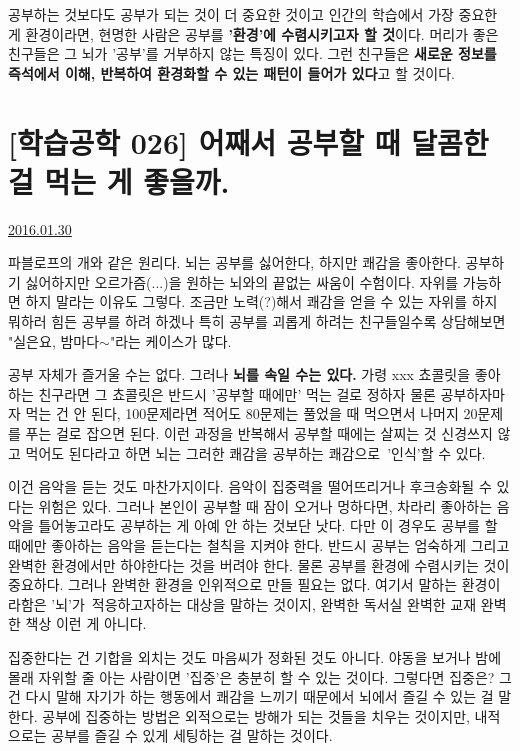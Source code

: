 공부하는 것보다도 공부가 되는 것이 더 중요한 것이고
인간의 학습에서 가장 중요한 게 환경이라면, 현명한 사람은 공부를 \textbf{'환경'에 수렴시키고자 할 것}이다.
머리가 좋은 친구들은 그 뇌가 '공부'를 거부하지 않는 특징이 있다.
그런 친구들은 \textbf{새로운 정보를 즉석에서 이해, 반복하여 환경화할 수 있는 패턴이 들어가 있다}고 할 것이다.
\vspace{5mm}






\section{[학습공학 026] 어째서 공부할 때 달콤한 걸 먹는 게 좋을까.}
\href{https://www.kockoc.com/Apoc/616850}{2016.01.30}

\vspace{5mm}

파블로프의 개와 같은 원리다.
뇌는 공부를 싫어한다, 하지만 쾌감을 좋아한다.
공부하기 싫어하지만 오르가즘(...)을 원하는 뇌와의 끝없는 싸움이 수험이다.
자위를 가능하면 하지 말라는 이유도 그렇다.
조금만 노력(?)해서 쾌감을 얻을 수 있는 자위를 하지 뭐하러 힘든 공부를 하려 하겠나
특히 공부를 괴롭게 하려는 친구들일수록 상담해보면 "실은요, 밤마다$\sim$"라는 케이스가 많다.
\vspace{5mm}

공부 자체가 즐거울 수는 없다. 그러나 \textbf{뇌를 속일 수는 있다.}
가령 xxx 쵸콜릿을 좋아하는 친구라면 그 쵸콜릿은 반드시 '공부할 때에만' 먹는 걸로 정하자
물론 공부하자마자 먹는 건 안 된다, 100문제라면 적어도 80문제는 풀었을 때 먹으면서 나머지 20문제를 푸는 걸로 잡으면 된다.
이런 과정을 반복해서 공부할 때에는 살찌는 것 신경쓰지 않고 먹어도 된다라고 하면
뇌는 그러한 쾌감을 공부하는 쾌감으로 '인식'할 수 있다.
\vspace{5mm}

이건 음악을 듣는 것도 마찬가지이다. 음악이 집중력을 떨어뜨리거나 후크송화될 수 있다는 위험은 있다.
그러나 본인이 공부할 때 잠이 오거나 멍하다면, 차라리 좋아하는 음악을 틀어놓고라도 공부하는 게 아예 안 하는 것보단 낫다.
다만 이 경우도 공부를 할 때에만 좋아하는 음악을 듣는다는 철칙을 지켜야 한다.
반드시 공부는 엄숙하게 그리고 완벽한 환경에서만 하야한다는 것을 버려야 한다.
물론 공부를 환경에 수렴시키는 것이 중요하다. 그러나 완벽한 환경을 인위적으로 만들 필요는 없다.
여기서 말하는 환경이라함은 '뇌'가 적응하고자하는 대상을 말하는 것이지, 완벽한 독서실 완벽한 교재 완벽한 책상 이런 게 아니다.
\vspace{5mm}

집중한다는 건 기합을 외치는 것도 마음씨가 정화된 것도 아니다.
야동을 보거나 밤에 몰래 자위할 줄 아는 사람이면 '집중'은 충분히 할 수 있는 것이다.
그렇다면 집중은? 그건 다시 말해 자기가 하는 행동에서 쾌감을 느끼기 때문에서 뇌에서 즐길 수 있는 걸 말한다.
공부에 집중하는 방법은 외적으로는 방해가 되는 것들을 치우는 것이지만, 내적으로는 공부를 즐길 수 있게 세팅하는 걸 말하는 것이다.
\vspace{5mm}

